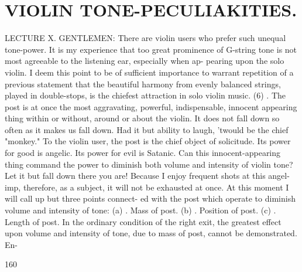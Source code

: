 \documentclass{article}
\begin{document}
\section*{VIOLIN TONE-PECULIAKITIES.}
LECTURE X. GENTLEMEN: There are violin users who prefer such unequal tone-power. It is my experience that too great prominence of G-string tone is not most agreeable to the listening ear, especially when ap- pearing upon the solo violin. I deem this point to be of sufficient importance to warrant repetition of a previous statement that the beautiful harmony from evenly balanced strings, played in double-stops, is the chiefest attraction in solo violin music. (6) . The post is at once the most aggravating, powerful, indispensable, innocent appearing thing within or without, around or about the violin. It does not fall down so often as it makes us fall down. Had it but ability to laugh, 'twould be the chief "monkey." To the violin user, the post is the chief object of solicitude. Its power for good is angelic. Its power for evil is Satanic. Can this innocent-appearing thing command the power to diminish both volume and intensity of violin tone? Let it but fall down there you are! Because I enjoy frequent shots at this angel-imp, therefore, as a subject, it will not be exhausted at once. At this moment I will call up but three points connect- ed with the post which operate to diminish volume and intensity of tone: (a) . Mass of post. (b) . Position of post. (c) . Length of post. In the ordinary condition of the right exit, the greatest effect upon volume and intensity of tone, due to mass of post, cannot be demonstrated. En-

160
\end{document}
